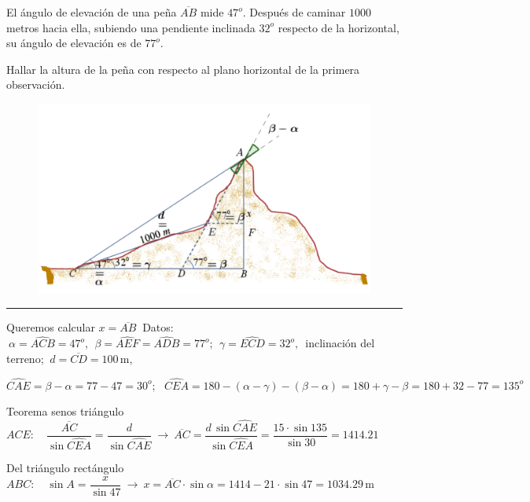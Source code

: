 \begin{miejercicio}

\begin{multicols}{2}

El ángulo de elevación de una peña $\overline{AB}$
 mide $47^o$. Después de caminar $1000$ metros hacia ella, subiendo una pendiente inclinada $32^o$ respecto de la horizontal, su ángulo de elevación es de $77^o$.
 
 \vspace{1mm}  Hallar la altura de la peña con respecto al plano horizontal de la primera observación.
 
	\begin{figure}[H]
	\centering
	\includegraphics[width=.5\textwidth]{img-triang/triang19.png}
\end{figure}
\end{multicols}


\rule{250pt}{0.1pt}

\vspace{2mm} Queremos calcular $x=\overline{AB}\ $ Datos: $\ \alpha=\widehat{ACB}=47^o,\ \ \beta=\widehat{AEF}=\widehat{ADB}=77^o;\ \ \gamma=\widehat{ECD}=32^o,\, $ inclinación del terreno; $\  d=\overline{CD}=100\, \mathrm{m}$,

\vspace{2mm} $\widehat{CAE}=\beta-\alpha=77-47=30^o;\ \ \ \widehat{CEA}=180-(\alpha-\gamma)-(\beta-\alpha)=180+\gamma-\beta=180+32-77=135^o$

\vspace{2mm} Teorema senos triángulo $ACE:\quad \dfrac{\overline{AC}}{\sin \widehat{CEA}}=\dfrac{d}{\sin \widehat{CAE}} \ \to \ \overline{AC}=\dfrac{d\, \sin \widehat{CAE}}{\sin \widehat{CEA}}=\dfrac{15\cdot \sin 135}{\sin 30}=1414.21$

\vspace{2mm} Del triángulo rectángulo $ABC:\quad \sin A=\dfrac{x}{\sin 47}\ \to \ x=\overline{AC}\cdot \sin \alpha=1414-21\cdot \sin 47=1034.29\, \mathrm{m}$

	
\end{miejercicio}


